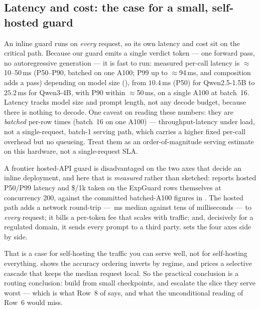 \documentclass[11pt]{article}
\begin{document}
\subsection{Latency and cost: the case for a small, self-hosted guard}
\label{sec:practitioner-cost}
An inline guard runs on \emph{every} request, so its own latency and cost sit on the critical path.
Because our guard emits a single verdict token --- one forward pass, no autoregressive generation --- it
is fast to run: measured per-call latency is $\approx$10--50\,ms (P50--P90, batched on one A100; P99 up to $\approx$94\,ms, and composition adds a pass) depending on model size
(), from $10.4$\,ms (P50) for Qwen2.5-1.5B to $25.2$\,ms for Qwen3-4B, with P90 within
$\approx$50\,ms, on a single A100 at batch~16. Latency tracks model size and prompt length, not any decode
budget, because there is nothing to decode. One caveat on reading these numbers: they are \emph{batched}
per-row times (batch~16 on one A100) --- throughput-latency under load, not a single-request, batch-1
serving path, which carries a higher fixed per-call overhead but no queueing. Treat them as an
order-of-magnitude serving estimate on this hardware, not a single-request SLA.



A frontier hosted-API guard is disadvantaged on the two axes that decide an inline deployment, and here
that is \emph{measured} rather than sketched:  reports hosted P50/P99 latency
and \$/1k taken on the ExpGuard rows themselves at concurrency 200, against the committed batched-A100
figures in . The hosted path adds a network round-trip --- \FrontierBestMedianMs\,ms
median against tens of milliseconds --- to \emph{every} request; it bills a per-token fee that scales
with traffic; and, decisively for a regulated domain, it sends every prompt to a third party.
 sets the four axes side by side.

That is a case for self-hosting the traffic you can serve well, not for self-hosting everything.
 shows the accuracy ordering inverts by regime, and 
prices a selective cascade that keeps the median request local. So the practical conclusion is a routing
conclusion: build from small checkpoints, and escalate the slice they serve worst --- which is what
Row~8 of  says, and what the unconditional reading of Row~6 would miss.
\end{document}
